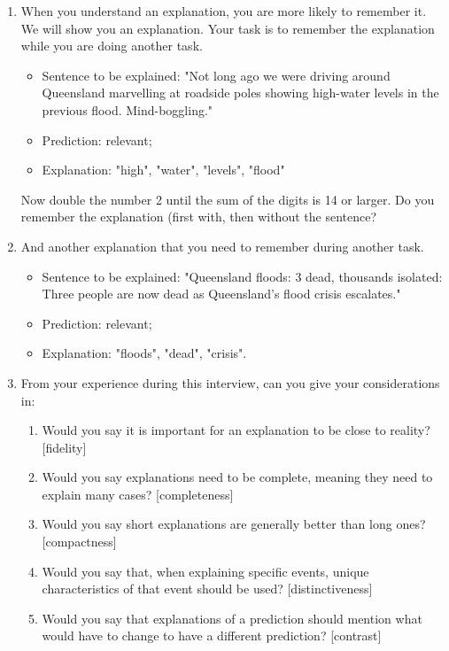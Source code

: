 \begin{enumerate}
    \item When you understand an explanation, you are more likely to remember it. We will show you an explanation. Your task is to remember the explanation while you are doing another task. \begin{itemize}
        \item Sentence to be explained: "Not long ago we were driving around Queensland marvelling at roadside poles showing high-water levels in the previous flood. Mind-boggling."
        \item Prediction: relevant;
        \item Explanation: "high", "water", "levels", "flood"
    \end{itemize}
    Now double the number 2 until the sum of the digits is 14 or larger.
    Do you remember the explanation (first with, then without the sentence?
    
    \item And another explanation that you need to remember during another task. \begin{itemize}
        \item Sentence to be explained: "Queensland floods: 3 dead, thousands isolated: Three people are now dead as Queensland’s flood crisis escalates."
        \item Prediction: relevant;
        \item Explanation: "floods", "dead", "crisis".
    \end{itemize}
    
    \item From your experience during this interview, can you give your considerations in: \begin{enumerate}
        \item Would you say it is important for an explanation to be close to reality? [fidelity]
        \item Would you say explanations need to be complete, meaning they need to explain many cases? [completeness]
        \item Would you say short explanations are generally better than long ones? [compactness]
        \item Would you say that, when explaining specific events, unique characteristics of that event should be used? [distinctiveness]
        \item Would you say that explanations of a prediction should mention what would have to change to have a different prediction? [contrast]
    \end{enumerate}
\end{enumerate}